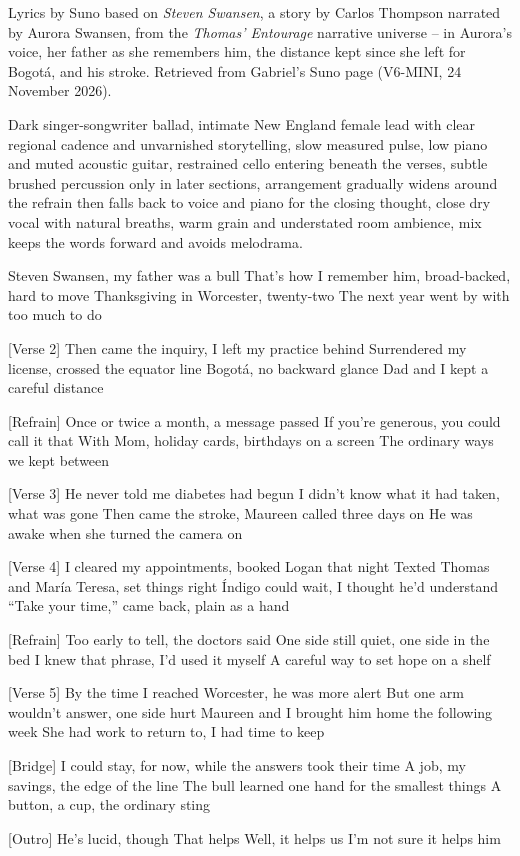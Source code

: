 \begin{notes}
Lyrics by Suno based on \emph{Steven Swansen}, a story by Carlos Thompson narrated by Aurora Swansen, from the \emph{Thomas' Entourage} narrative universe -- in Aurora's voice, her father as she remembers him, the distance kept since she left for Bogotá, and his stroke. Retrieved from Gabriel's Suno page (V6-MINI, 24 November 2026).
\end{notes}
\begin{style}
Dark singer-songwriter ballad, intimate New England female lead with clear regional cadence and unvarnished storytelling, slow measured pulse, low piano and muted acoustic guitar, restrained cello entering beneath the verses, subtle brushed percussion only in later sections, arrangement gradually widens around the refrain then falls back to voice and piano for the closing thought, close dry vocal with natural breaths, warm grain and understated room ambience, mix keeps the words forward and avoids melodrama.
\end{style}
\begin{lyrics}
[Verse 1]
Steven Swansen, my father was a bull
That’s how I remember him, broad-backed, hard to move
Thanksgiving in Worcester, twenty-two
The next year went by with too much to do

[Verse 2]
Then came the inquiry, I left my practice behind
Surrendered my license, crossed the equator line
Bogotá, no backward glance
Dad and I kept a careful distance

[Refrain]
Once or twice a month, a message passed
If you’re generous, you could call it that
With Mom, holiday cards, birthdays on a screen
The ordinary ways we kept between

[Verse 3]
He never told me diabetes had begun
I didn’t know what it had taken, what was gone
Then came the stroke, Maureen called three days on
He was awake when she turned the camera on

[Verse 4]
I cleared my appointments, booked Logan that night
Texted Thomas and María Teresa, set things right
Índigo could wait, I thought he’d understand
“Take your time,” came back, plain as a hand

[Refrain]
Too early to tell, the doctors said
One side still quiet, one side in the bed
I knew that phrase, I’d used it myself
A careful way to set hope on a shelf

[Verse 5]
By the time I reached Worcester, he was more alert
But one arm wouldn’t answer, one side hurt
Maureen and I brought him home the following week
She had work to return to, I had time to keep

[Bridge]
I could stay, for now, while the answers took their time
A job, my savings, the edge of the line
The bull learned one hand for the smallest things
A button, a cup, the ordinary sting

[Outro]
He’s lucid, though
That helps
Well, it helps us
I’m not sure it helps him
\end{lyrics}

